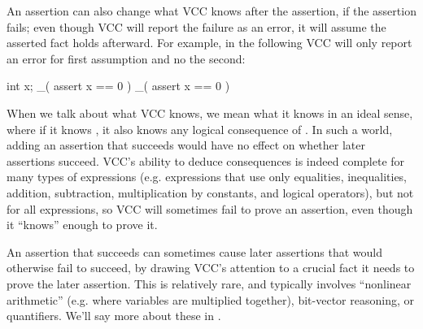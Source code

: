 

An assertion can also change what VCC knows after the assertion, if
the assertion fails; even though VCC will report the failure as an error,
it will assume the asserted fact holds afterward. For example, in the following
VCC will only report an error for first assumption and no the second:
\begin{VCC}
int x;
_( assert x == 0 )
_( assert x == 0 )
\end{VCC}

When we talk about what VCC knows, we mean what it knows in an ideal
sense, where if it knows , it also knows any logical
consequence of . In such a world, adding an assertion that
succeeds would have no effect on whether later assertions succeed.
VCC's ability to deduce consequences is indeed complete for many types
of expressions (e.g. expressions that use only equalities,
inequalities, addition, subtraction, multiplication by constants, and
logical operators), but not for all expressions, so VCC will
sometimes fail to prove an assertion, even though it ``knows'' enough
to prove it.  

An assertion that succeeds can sometimes cause later assertions that
would otherwise fail to succeed, by drawing VCC's attention to a
crucial fact it needs to prove the later assertion.  This is
relatively rare, and typically involves ``nonlinear arithmetic''
(e.g. where variables are multiplied together), bit-vector reasoning,
or quantifiers. We'll say more about these in .

